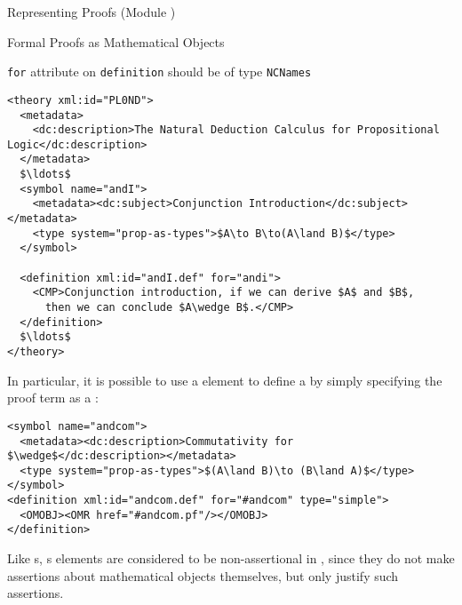 \begin{tchapter}[id=proofs,short=Representing Proofs]{Representing Proofs (Module {})}
\begin{tsection}[id=proofobjects]{Formal Proofs as Mathematical Objects}
\begin{erratum}[reported-by=Michael Kohlhase,date=2009-08-11]{{\texttt{for}} attribute on
    {\texttt{definition}} should be of type {\texttt{NCNames}}}
\begin{lstlisting}[label=lst:plnd,mathescape,
  caption={A Theory for Propositional Natural Deduction}]
<theory xml:id="PL0ND">
  <metadata>
    <dc:description>The Natural Deduction Calculus for Propositional Logic</dc:description>
  </metadata>
  $\ldots$
  <symbol name="andI">
    <metadata><dc:subject>Conjunction Introduction</dc:subject></metadata>
    <type system="prop-as-types">$A\to B\to(A\land B)$</type>
  </symbol>

  <definition xml:id="andI.def" for="andi">
    <CMP>Conjunction introduction, if we can derive $A$ and $B$, 
      then we can conclude $A\wedge B$.</CMP>
  </definition>
  $\ldots$
</theory>
\end{lstlisting}
\end{erratum}

In particular, it is possible to use a {}
element to define a {} by simply specifying the proof
term as a {}:
\begin{lstlisting}[mathescape]
<symbol name="andcom">
  <metadata><dc:description>Commutativity for $\wedge$</dc:description></metadata>
  <type system="prop-as-types">$(A\land B)\to (B\land A)$</type>
</symbol>
<definition xml:id="andcom.def" for="#andcom" type="simple">
  <OMOBJ><OMR href="#andcom.pf"/></OMOBJ>
</definition>
\end{lstlisting}
Like {s}, {s} elements are considered to be
non-assertional in {\omdoc}, since they do not make
assertions about mathematical objects themselves, but only justify such assertions.
\end{tsection}
\end{tchapter}



